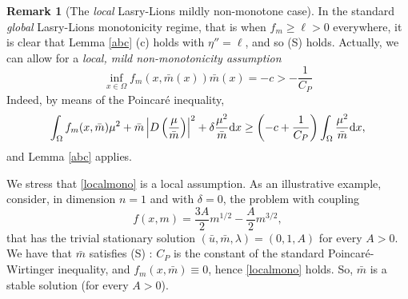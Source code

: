 \documentclass[10pt,a4paper,nouppercase,nowrite]{article}
\numberwithin{equation}{section}
\newcommand{\di}{{\rm d}}
\newcommand{\Sp}{{\textsc (S)} }
\theoremstyle{definition}
\newtheorem{rmk}[defn]{Remark}
\begin{document}
\begin{rmk}[The \textit{local} Lasry-Lions mildly non-monotone case]\label{localLLrmk} In the standard \textit{global} Lasry-Lions monotonicity regime, that is when $f_m \ge \ell > 0$ everywhere, it is clear that Lemma \ref{abc} (c) holds with $\eta'' = \ell$, and so \Sp holds. Actually, we can allow for a \textit{local, mild non-monotonicity assumption}
\begin{equation}\label{localmono}
\inf_{x \in \Omega} f_m(x,\bar{m}(x))\bar m(x) = -c > - \frac 1 {C_P}
\end{equation}
Indeed, by means of the Poincar\'e inequality,
\[
\int_{\Omega} f_m(x,\bar{m}) \mu^2 + \bar{m} \left| D\left( \frac{\mu}{\bar{m}} \right) \right|^2 + \delta \frac{\mu^2}{\bar{m}} \di x \geq  \left( -c + \frac{1}{C_P} \right)  \int_{\Omega}  \frac{\mu^2}{\bar{m}} \di x,
\]
and Lemma \ref{abc} applies.

We stress that \eqref{localmono} is a local assumption. As an illustrative example, consider, in dimension $n=1$ and with $\delta = 0$, the problem with coupling
\[
f(x,m) = \frac{3A}2 m^{1/2} - \frac{A}2 m^{3/2},
\]
that has the trivial stationary solution $(\bar u, \bar m, \lambda) = (0, 1, A)$ for every $A > 0$. We have that $\bar m$ satisfies \Sp : $C_P$ is the constant of the standard Poincar\'e-Wirtinger inequality, and $f_m(x, \bar m) \equiv 0$, hence \eqref{localmono} holds. So, $\bar m$ is a stable solution (for every $A > 0$).


\end{rmk}
\end{document}
